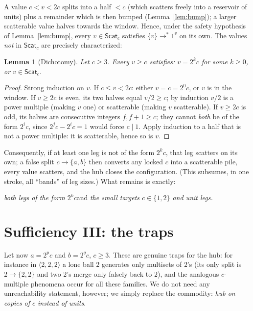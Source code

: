 \documentclass[11pt]{article}
\newtheorem{lemma}[theorem]{Lemma}
\theoremstyle{definition}
\theoremstyle{remark}
\newcommand{\lie}[3]{\langle #1,#2,#3\rangle}
\newcommand{\ms}[1]{\{#1\}}
\newcommand{\reach}{\longrightarrow^{*}}
\newcommand{\Scat}{\mathsf{Scat}}
\begin{document}
A value $c<v<2c$ splits into a half $<c$ (which scatters freely into a
reservoir of units) plus a remainder which is then bumped
(Lemma~\ref{lem:bump}); a larger scatterable value halves towards the
window.  Hence, under the safety hypothesis of Lemma~\ref{lem:bump}, every
$v\in\Scat_c$ satisfies $\ms{v}\reach 1^{v}$ on its own.  The values
\emph{not} in $\Scat_c$ are precisely characterized:

\begin{lemma}[Dichotomy]\label{lem:dichotomy}
Let $c\ge 3$.  Every $v\ge c$ satisfies: $v=2^k c$ for some $k\ge 0$, or
$v\in\Scat_c$.
\end{lemma}

\begin{proof}
Strong induction on $v$.  If $c\le v<2c$: either $v=c=2^0c$, or $v$ is in
the window.  If $v\ge 2c$ is even, its two halves equal $v/2\ge c$; by
induction $v/2$ is a power multiple (making $v$ one) or scatterable (making
$v$ scatterable).  If $v\ge 2c$ is odd, its halves are consecutive integers
$f,f+1\ge c$; they cannot \emph{both} be of the form $2^ic$, since
$2^jc-2^ic=1$ would force $c\mid 1$.  Apply induction to a half that is not
a power multiple: it is scatterable, hence so is $v$.
\end{proof}

Consequently, if at least one leg is not of the form $2^kc$, that leg
scatters on its own; a false split $c\to\{a,b\}$ then converts any locked
$c$ into a scatterable pile, every value scatters, and the hub closes the
configuration.  (This subsumes, in one stroke, all ``bands'' of leg sizes.)
What remains is exactly:

\begin{center}
\emph{both legs of the form $2^kc$}\qquad and\qquad
\emph{the small targets $c\in\{1,2\}$ and unit legs.}
\end{center}

\section{Sufficiency III: the traps}\label{sec:traps}

Let now $a=2^pc$ and $b=2^qc$, $c\ge 3$.  These are genuine traps for the
hub: for instance in $\lie{2}{2}{2}$ a lone ball $2$ generates only
multisets of $2$'s (its only split is $2\to\{2,2\}$ and two $2$'s merge
only falsely back to $2$), and the analogous $c$-multiple phenomena occur
for all these families.  We do not need any unreachability statement,
however; we simply replace the commodity: \emph{hub on copies of $c$
instead of units}.
\end{document}
